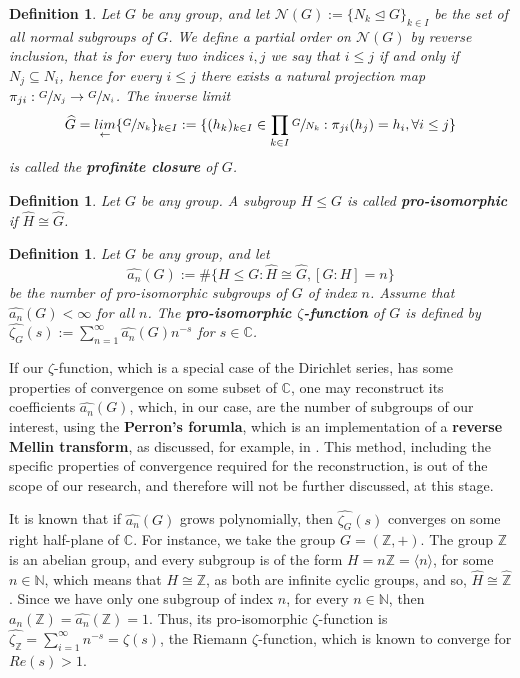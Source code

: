 \documentclass[12pt]{article}
\newtheorem{definition}[theorem]{Definition}
\begin{document}
\begin{definition}
\label{def:profinite.closure}
Let $G$ be any group, and let $\mathcal{N}(G):=\{N_k\trianglelefteq G\}_{k\in I}$ be the set of all normal subgroups of $G$. We define a partial order on $\mathcal{N}(G)$ by reverse inclusion, that is for every two indices $i,j$ we say that $i\leq j$ if and only if $N_j\subseteq N_i$, hence for every $i\leq j$ there exists a natural projection map $\pi_{ji}:\sfrac{G}{N_
j}\rightarrow\sfrac{G}{N_i}$. The inverse limit \[\widehat{G}=\underset{\leftarrow}{lim}\{\sfrac{G}{N_k}\}_{k\in I}:=\{(h_k)_{k\in I}\in\prod_{k\in I}\sfrac{G}{N_k} : \pi_{ji}(h_j)=h_i,\forall i\leq j\}\] is called the \textbf{profinite closure} of $G$.
\end{definition}
\begin{definition}
\label{def:pro.isomorphic}
Let $G$ be any group. A subgroup $H\leq G$ is called \textbf{pro-isomorphic} if $\widehat{H}\cong\widehat{G}$.
\end{definition}
\begin{definition}
\label{def:zeta.pro.isomorphic}
Let $G$ be any group, and let \[\hat{a_n}(G):=\#\{H\leq G : \widehat{H}\cong\widehat{G}, [G:H]=n\}\] be the number of pro-isomorphic subgroups of $G$ of index $n$. Assume that $\hat{a_n}(G)<\infty$ for all $n$. The \textbf{pro-isomorphic $\zeta$-function} of $G$ is defined by $\hat{\zeta_G}(s):=\sum_{n=1}^{\infty}\hat{a_n}(G)n^{-s}$ for $s\in\mathbb{C}$.
\end{definition}
If our $\zeta$-function, which is a special case of the Dirichlet series, has some properties of convergence on some subset of $\mathbb{C}$, one may reconstruct its coefficients $\hat{a_n}(G)$, which, in our case, are the number of subgroups of our interest, using the \textbf{Perron's forumla}, which is an implementation of a \textbf{reverse Mellin transform}, as discussed, for example, in \cite{MontgomeryVaughan}. This method, including the specific properties of convergence required for the reconstruction, is out of the scope of our research, and therefore will not be further discussed, at this stage.\par
It is known that if $\hat{a_n}(G)$ grows polynomially, then $\hat{\zeta_G}(s)$ converges on some right half-plane of $\mathbb{C}$. For instance, we take the group $G=(\mathbb{Z},+)$. The group $\mathbb{Z}$ is an abelian group, and every subgroup is of the form $H=n\mathbb{Z}=\langle n\rangle$, for some $n\in\mathbb{N}$, which means that $H\cong \mathbb{Z}$, as both are infinite cyclic groups, and so, $\widehat{H}\cong\widehat{\mathbb{Z}}$. Since we have only one subgroup of index $n$, for every $n\in\mathbb{N}$, then $a_n(\mathbb{Z})=\hat{a_n}(\mathbb{Z})=1$. Thus, its pro-isomorphic $\zeta$-function is $\hat{\zeta_{\mathbb{Z}}}=\sum_{i=1}^{\infty}n^{-s}=\zeta(s)$, the Riemann $\zeta$-function, which is known to converge for $Re(s)>1$.\par
\end{document}
